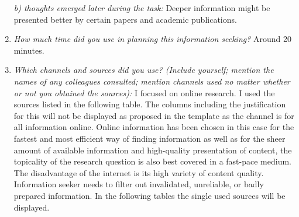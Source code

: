 \documentclass[11pt,letterpaper]{article}
\begin{document}
\begin{enumerate}
\textit{b) thoughts emerged later during the task:} Deeper information might be presented better by certain papers and academic publications.
\item \textit{How much time did you use in planning this information seeking?} Around 20 minutes.
\item \textit{Which channels and sources did you use? (Include yourself; mention the names of
any colleagues consulted; mention channels used no matter whether or not you obtained the sources):}
I focused on online research. I used the sources listed in the following table. The columns  including the justification for this will not be displayed as proposed in the template as the channel is for all information online. Online information has been chosen in this case for the fastest and most efficient way of finding information as well as for the sheer amount of available information and high-quality presentation of content, the topicality of the research question is also best covered in a fast-pace medium. The disadvantage of the internet is its high variety of content quality. Information seeker needs to filter out invalidated, unreliable, or badly prepared information. In the following tables the single used sources will be displayed.

\begin{table}[H]
	\centering


\end{table}
\end{enumerate}
\end{document}
